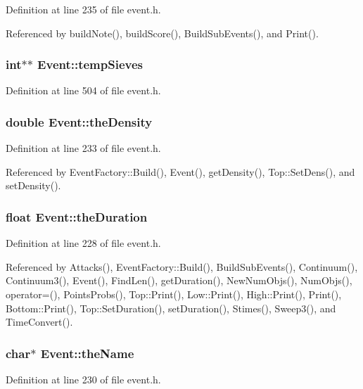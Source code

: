 Definition at line 235 of file event.h.

Referenced by build\-Note(), build\-Score(), Build\-Sub\-Events(), and Print().
\subsubsection{\setlength{\rightskip}{0pt plus 5cm}int$\ast$$\ast$ {\bf Event::temp\-Sieves}}\label{classEvent_o54}




Definition at line 504 of file event.h.
\subsubsection{\setlength{\rightskip}{0pt plus 5cm}double {\bf Event::the\-Density}}\label{classEvent_o11}




Definition at line 233 of file event.h.

Referenced by Event\-Factory::Build(), Event(), get\-Density(), Top::Set\-Dens(), and set\-Density().
\subsubsection{\setlength{\rightskip}{0pt plus 5cm}float {\bf Event::the\-Duration}}\label{classEvent_o6}




Definition at line 228 of file event.h.

Referenced by Attacks(), Event\-Factory::Build(), Build\-Sub\-Events(), Continuum(), Continuum3(), Event(), Find\-Len(), get\-Duration(), New\-Num\-Objs(), Num\-Objs(), operator=(), Points\-Probs(), Top::Print(), Low::Print(), High::Print(), Print(), Bottom::Print(), Top::Set\-Duration(), set\-Duration(), Stimes(), Sweep3(), and Time\-Convert().
\subsubsection{\setlength{\rightskip}{0pt plus 5cm}char$\ast$ {\bf Event::the\-Name}}\label{classEvent_o8}




Definition at line 230 of file event.h.

